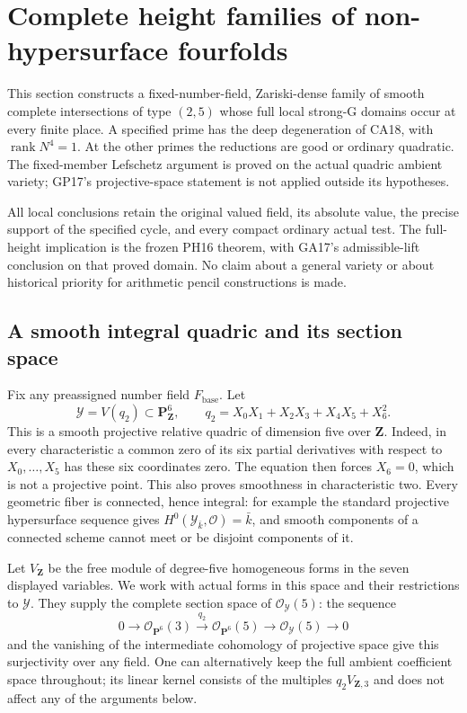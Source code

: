 \section{Complete height families of non-hypersurface fourfolds}
\label{r18cg:section}

This section constructs a fixed-number-field, Zariski-dense family
of smooth complete intersections of type $(2,5)$ whose full local
strong-G domains occur at every finite place.  A specified prime
has the deep degeneration of CA18, with $\operatorname{rank}N^4=1$.
At the other primes the reductions are good or ordinary quadratic.
The fixed-member Lefschetz argument is proved on the actual quadric
ambient variety; GP17's projective-space statement is not applied
outside its hypotheses.

All local conclusions retain the original valued field, its absolute
value, the precise support of the specified cycle, and every compact
ordinary actual test.  The full-height implication is the frozen
PH16 theorem, with GA17's admissible-lift conclusion on that proved
domain.  No claim about a general variety or about historical
priority for arithmetic pencil constructions is made.

\subsection{A smooth integral quadric and its section space}

Fix any preassigned number field $F_{\mathrm{base}}$.  Let
\[
 \mathcal Y=V(q_2)\subset\mathbf P^6_{\mathbf Z},\qquad
 q_2=X_0X_1+X_2X_3+X_4X_5+X_6^2.
 \tag{CG18.1}\label{r18cg:quadric}
\]
This is a smooth projective relative quadric of dimension five
over $\mathbf Z$.  Indeed, in every characteristic a common zero
of its six partial derivatives with respect to $X_0,\ldots,X_5$
has these six coordinates zero.  The equation then forces
$X_6=0$, which is not a projective point.  This also proves
smoothness in characteristic two.  Every geometric fiber is
connected, hence integral: for example the standard projective
hypersurface sequence gives $H^0(\mathcal Y_{\bar k},\mathcal O)=\bar k$,
and smooth components of a connected scheme cannot meet or be
disjoint components of it.

Let $V_{\mathbf Z}$ be the free module of degree-five homogeneous
forms in the seven displayed variables.  We work with actual forms
in this space and their restrictions to $\mathcal Y$.
They supply the complete section space of $\mathcal O_{\mathcal Y}(5)$:
the sequence
\[
 0\longrightarrow\mathcal O_{\mathbf P^6}(3)
    \xrightarrow{q_2}\mathcal O_{\mathbf P^6}(5)
    \longrightarrow\mathcal O_{\mathcal Y}(5)\longrightarrow0
 \tag{CG18.2}\label{r18cg:section-sequence}
\]
and the vanishing of the intermediate cohomology of projective
space give this surjectivity over any field.  One can alternatively
keep the full ambient coefficient space throughout; its linear
kernel consists of the multiples $q_2V_{\mathbf Z,3}$ and does not
affect any of the arguments below.

